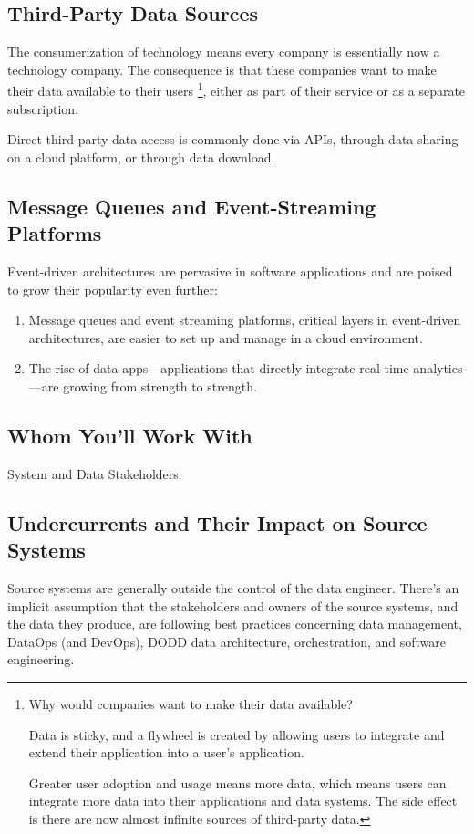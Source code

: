\subsection*{Third-Party Data Sources}
The consumerization of technology means every company is
essentially now a technology company. The consequence is that
these companies want to make their data available to their users
\footnote{
    Why would companies want to make their data available?
    
    Data is sticky, and a flywheel is created by allowing users
    to integrate and extend their application into a user's
    application.
    
    Greater user adoption and usage means more data, which means
    users can integrate more data into their applications and
    data systems. The side effect is there are now almost infinite
    sources of third-party data.
},
either as part of their service or as a separate subscription.

Direct third-party data access is commonly done via APIs, through
data sharing on a cloud platform, or through data download.


\subsection*{Message Queues and Event-Streaming Platforms}
Event-driven architectures are pervasive in software applications
and are poised to grow their popularity even further:
\begin{enumerate}
    \item Message queues and event streaming platforms,
    critical layers in event-driven architectures, are easier to
    set up and manage in a cloud environment.

    \item The rise of data apps—applications that directly
    integrate real-time analytics—are growing from strength to
    strength.
\end{enumerate}







\subsection{Whom You'll Work With}
System and Data Stakeholders.



\subsection{Undercurrents and Their Impact on Source Systems}
Source systems are generally outside the control of the data
engineer. There's an implicit assumption that the stakeholders
and owners of the source systems, and the data they produce, are
following best practices concerning data management, DataOps
(and DevOps), DODD data architecture, orchestration, and software
engineering.

